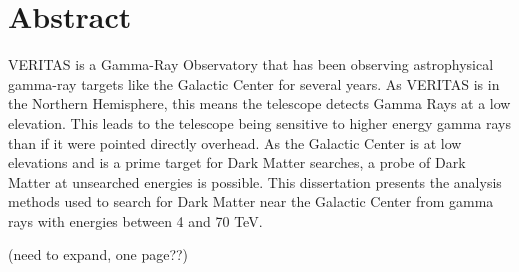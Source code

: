 \cleartooddpage[\thispagestyle{empty}]
\section*{Abstract}

VERITAS is a Gamma-Ray Observatory that has been observing astrophysical gamma-ray targets like the Galactic Center for several years.
As VERITAS is in the Northern Hemisphere, this means the telescope detects Gamma Rays at a low elevation.
This leads to the telescope being sensitive to higher energy gamma rays than if it were pointed directly overhead.
As the Galactic Center is at low elevations and is a prime target for Dark Matter searches, a probe of Dark Matter at unsearched energies is possible.
This dissertation presents the analysis methods used to search for Dark Matter near the Galactic Center from gamma rays with energies between 4 and 70 TeV.

{\color{red}(need to expand, one page??)}


\cleartoevenpage[\thispagestyle{plain}]
\null
